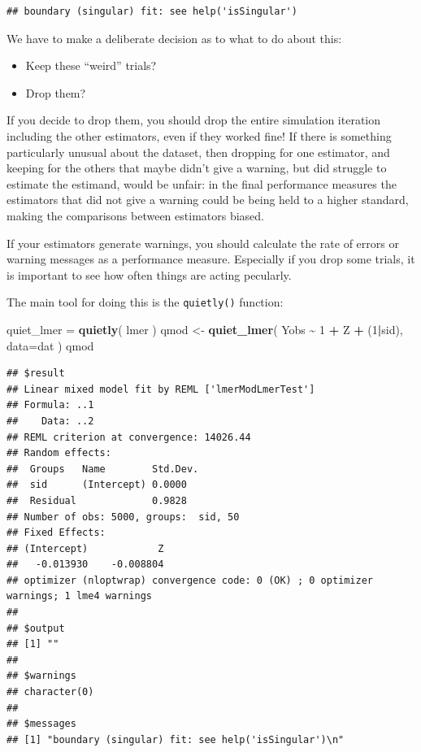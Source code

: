 \documentclass[
]{book}
\newenvironment{Shaded}{\begin{snugshade}}{\end{snugshade}}
\newcommand{\AttributeTok}[1]{\textcolor[rgb]{0.13,0.29,0.53}{#1}}
\newcommand{\DecValTok}[1]{\textcolor[rgb]{0.00,0.00,0.81}{#1}}
\newcommand{\FunctionTok}[1]{\textcolor[rgb]{0.13,0.29,0.53}{\textbf{#1}}}
\newcommand{\NormalTok}[1]{#1}
\newcommand{\OtherTok}[1]{\textcolor[rgb]{0.56,0.35,0.01}{#1}}
\newcommand{\SpecialCharTok}[1]{\textcolor[rgb]{0.81,0.36,0.00}{\textbf{#1}}}
\providecommand{\tightlist}{%
  \setlength{\itemsep}{0pt}\setlength{\parskip}{0pt}}
\begin{document}
\begin{verbatim}
## boundary (singular) fit: see help('isSingular')
\end{verbatim}

We have to make a deliberate decision as to what to do about this:

\begin{itemize}
\tightlist
\item
  Keep these ``weird'' trials?
\item
  Drop them?
\end{itemize}

If you decide to drop them, you should drop the entire simulation iteration including the other estimators, even if they worked fine!
If there is something particularly unusual about the dataset, then dropping for one estimator, and keeping for the others that maybe didn't give a warning, but did struggle to estimate the estimand, would be unfair: in the final performance measures the estimators that did not give a warning could be being held to a higher standard, making the comparisons between estimators biased.

If your estimators generate warnings, you should calculate the rate of errors or warning messages as a performance measure.
Especially if you drop some trials, it is important to see how often things are acting pecularly.

The main tool for doing this is the \texttt{quietly()} function:

\begin{Shaded}
\begin{Highlighting}[]
\NormalTok{quiet\_lmer }\OtherTok{=} \FunctionTok{quietly}\NormalTok{( lmer )}
\NormalTok{qmod }\OtherTok{\textless{}{-}} \FunctionTok{quiet\_lmer}\NormalTok{( Yobs }\SpecialCharTok{\textasciitilde{}} \DecValTok{1} \SpecialCharTok{+}\NormalTok{ Z }\SpecialCharTok{+}\NormalTok{ (}\DecValTok{1}\SpecialCharTok{|}\NormalTok{sid), }\AttributeTok{data=}\NormalTok{dat )}
\NormalTok{qmod}
\end{Highlighting}
\end{Shaded}

\begin{verbatim}
## $result
## Linear mixed model fit by REML ['lmerModLmerTest']
## Formula: ..1
##    Data: ..2
## REML criterion at convergence: 14026.44
## Random effects:
##  Groups   Name        Std.Dev.
##  sid      (Intercept) 0.0000  
##  Residual             0.9828  
## Number of obs: 5000, groups:  sid, 50
## Fixed Effects:
## (Intercept)            Z  
##   -0.013930    -0.008804  
## optimizer (nloptwrap) convergence code: 0 (OK) ; 0 optimizer warnings; 1 lme4 warnings 
## 
## $output
## [1] ""
## 
## $warnings
## character(0)
## 
## $messages
## [1] "boundary (singular) fit: see help('isSingular')\n"
\end{verbatim}
\end{document}
